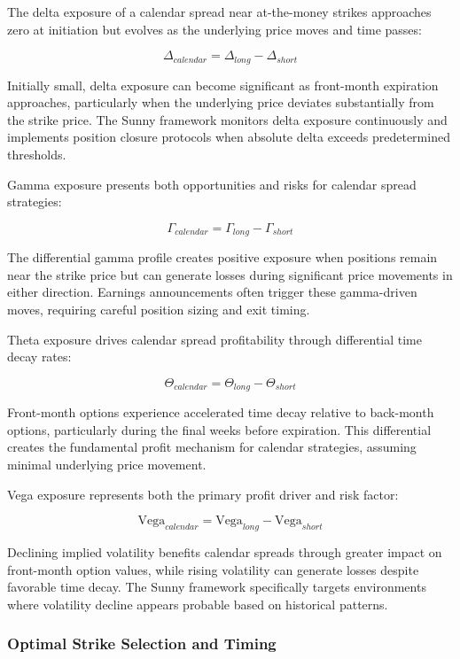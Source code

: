 \documentclass[
  american,
  11pt,
  11pt,
  letterpaper,
  onecolumn]{article}
\begin{document}
The delta exposure of a calendar spread near at-the-money strikes
approaches zero at initiation but evolves as the underlying price moves
and time passes:

\[\Delta_{calendar} = \Delta_{long} - \Delta_{short}\]

Initially small, delta exposure can become significant as front-month
expiration approaches, particularly when the underlying price deviates
substantially from the strike price. The Sunny framework monitors delta
exposure continuously and implements position closure protocols when
absolute delta exceeds predetermined thresholds.

Gamma exposure presents both opportunities and risks for calendar spread
strategies:

\[\Gamma_{calendar} = \Gamma_{long} - \Gamma_{short}\]

The differential gamma profile creates positive exposure when positions
remain near the strike price but can generate losses during significant
price movements in either direction. Earnings announcements often
trigger these gamma-driven moves, requiring careful position sizing and
exit timing.

Theta exposure drives calendar spread profitability through differential
time decay rates:

\[\Theta_{calendar} = \Theta_{long} - \Theta_{short}\]

Front-month options experience accelerated time decay relative to
back-month options, particularly during the final weeks before
expiration. This differential creates the fundamental profit mechanism
for calendar strategies, assuming minimal underlying price movement.

Vega exposure represents both the primary profit driver and risk factor:

\[\text{Vega}_{calendar} = \text{Vega}_{long} - \text{Vega}_{short}\]

Declining implied volatility benefits calendar spreads through greater
impact on front-month option values, while rising volatility can
generate losses despite favorable time decay. The Sunny framework
specifically targets environments where volatility decline appears
probable based on historical patterns.

\subsubsection{Optimal Strike Selection and
Timing}\label{optimal-strike-selection-and-timing}
\end{document}
